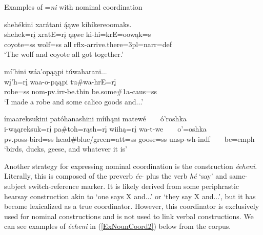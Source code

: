 \begin{exe}

\item\label{ExNounCoord} Examples of =\textit{ni} with nominal coordination

\begin{xlist}

\item\label{ExNounCoordA} \glll shehékini xarátani ą́ąwe kihíkereoomaks.\\
shehek=rį xratE=rį ąąwe ki-hi=krE=oowąk=s\\
\textnormal{coyote}=ss \textnormal{wolf}=ss \textnormal{all} rflx-\textnormal{arrive.there}=3pl=narr=def\\
\glt `The wolf and coyote all got together.' \citep[43]{hollow1973a}

\item\label{ExNounCoordB} \glll mí'hini wáa'opąąpi túwaharani...\\
wį'h=rį waa-o-pąąpi tu\#wa-hrE=rį\\
\textnormal{robe}=ss nom-pv.irr-\textnormal{be.thin} \textnormal{be.some}\#1a-caus=ss\\
\glt `I made a robe and some calico goods and...' \citep[62]{hollow1973a}

\item\label{ExNounCoordC} \glll ímaareksukini patóhanashini míihąni matewé ~ ~ ó'roshka\\
i-wąąreksuk=rį pa\#toh=rąsh=rį wiihą=rį wa-t-we ~ ~ o'=oshka\\
pv.poss-\textnormal{bird}=ss \textnormal{head}\#\textnormal{blue/green}=att=ss \textnormal{goose}=ss unsp-wh-indf ~ ~ \textnormal{be}=emph\\
\glt `birds, ducks, geese, and whatever it is' \citep[91]{hollow1973a}

\end{xlist}


\end{exe}

Another strategy for expressing nominal coordination is the construction \textit{éeheni}. Literally, this is composed of the preverb \textit{ée}- plus the verb \textit{hé} `say' and same-subject switch-reference marker. It is likely derived from some periphrastic hearsay construction akin to `one says X and...' or `they say X and...', but it has become lexicalized as a true coordinator. However, this coordinator is exclusively used for nominal constructions and is not used to link verbal constructions. We can see examples of \textit{éeheni} in (\ref{ExNounCoord2}) below from the corpus. 

